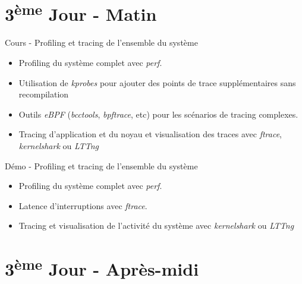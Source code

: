 \documentclass[a4paper,12pt,obeyspaces,spaces,hyphens]{article}
\begin{document}
\section{3\textsuperscript{ème} Jour - Matin}

\feagendatwocolumn
{Cours - Profiling et tracing de l'ensemble du système}
{
  \begin{itemize}
  \item Profiling du système complet avec {\em perf}.
  \item Utilisation de {\em kprobes} pour ajouter des points de trace
    supplémentaires sans recompilation
  \item Outils {\em eBPF} ({\em bcctools}, {\em bpftrace}, etc) pour
    les scénarios de tracing complexes.
  \item Tracing d'application et du noyau et visualisation des traces
    avec {\em ftrace}, {\em kernelshark} ou {\em LTTng}
  \end{itemize}
}
{Démo - Profiling et tracing de l'ensemble du système}
{
  \begin{itemize}
  \item Profiling du système complet avec {\em perf}.
  \item Latence d'interruptions avec {\em ftrace}.
  \item Tracing et visualisation de l'activité du système avec {\em
      kernelshark} ou {\em LTTng}
  \end{itemize}
}

\section{3\textsuperscript{ème} Jour - Après-midi}
\end{document}
